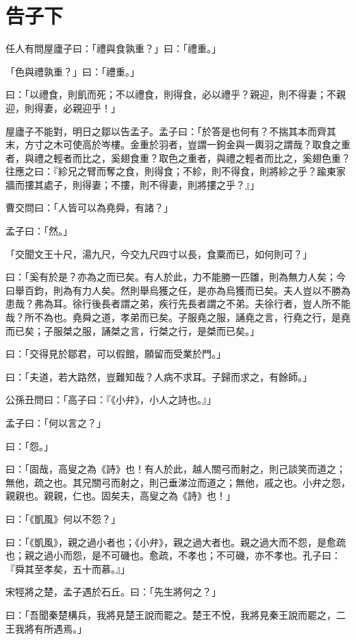 \documentclass[12pt,a4paper]{ctexbook}
\begin{document}
\section{告子下}
任人有問屋廬子曰：「禮與食孰重？」曰：「禮重。」\par
「色與禮孰重？」曰：「禮重。」\par
曰：「以禮食，則飢而死；不以禮食，則得食，必以禮乎？親迎，則不得妻；不親迎，則得妻，必親迎乎！」\par
屋廬子不能對，明日之鄒以告孟子。孟子曰：「於答是也何有？不揣其本而齊其末，方寸之木可使高於岑樓。金重於羽者，豈謂一鉤金與一輿羽之謂哉？取食之重者，與禮之輕者而比之，奚翅食重？取色之重者，與禮之輕者而比之，奚翅色重？往應之曰：『紾兄之臂而奪之食，則得食；不紾，則不得食，則將紾之乎？踰東家牆而摟其處子，則得妻；不摟，則不得妻，則將摟之乎？』」\par
曹交問曰：「人皆可以為堯舜，有諸？」\par
孟子曰：「然。」\par
「交聞文王十尺，湯九尺，今交九尺四寸以長，食粟而已，如何則可？」\par
曰：「奚有於是？亦為之而已矣。有人於此，力不能勝一匹雛，則為無力人矣；今曰舉百鈞，則為有力人矣。然則舉烏獲之任，是亦為烏獲而已矣。夫人豈以不勝為患哉？弗為耳。徐行後長者謂之弟，疾行先長者謂之不弟。夫徐行者，豈人所不能哉？所不為也。堯舜之道，孝弟而已矣。子服堯之服，誦堯之言，行堯之行，是堯而已矣；子服桀之服，誦桀之言，行桀之行，是桀而已矣。」\par
曰：「交得見於鄒君，可以假館，願留而受業於門。」\par
曰：「夫道，若大路然，豈難知哉？人病不求耳。子歸而求之，有餘師。」\par
公孫丑問曰：「高子曰：『《小弁》，小人之詩也。』」\par
孟子曰：「何以言之？」\par
曰：「怨。」\par
曰：「固哉，高叟之為《詩》也！有人於此，越人關弓而射之，則己談笑而道之；無他，疏之也。其兄關弓而射之，則己垂涕泣而道之；無他，戚之也。小弁之怨，親親也。親親，仁也。固矣夫，高叟之為《詩》也！」\par
曰：「《凱風》何以不怨？」\par
曰：「《凱風》，親之過小者也；《小弁》，親之過大者也。親之過大而不怨，是愈疏也；親之過小而怨，是不可磯也。愈疏，不孝也；不可磯，亦不孝也。孔子曰：『舜其至孝矣，五十而慕。』」\par
宋牼將之楚，孟子遇於石丘。曰：「先生將何之？」\par
曰：「吾聞秦楚構兵，我將見楚王說而罷之。楚王不悅，我將見秦王說而罷之，二王我將有所遇焉。」\par
\end{document}
